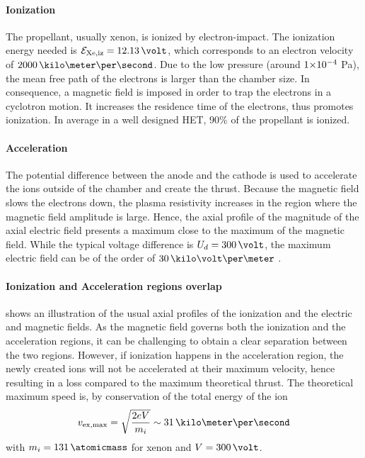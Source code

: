   \paragraph{Ionization\\}
  The propellant, usually xenon, is ionized by electron-impact.
  The ionization energy needed is $\mathcal{E}_{\rm Xe, iz} = 12.13 \,\volt$, which corresponds to an electron velocity of $2000\,\kilo\meter\per\second$.
  Due to the low pressure (around ${{1}{\times}10^{-4}}$ Pa), the mean free path of the electrons is larger than the chamber size.
  In consequence, a magnetic field is imposed in order to trap the electrons in a cyclotron motion.
  It increases the residence time of the electrons, thus promotes  ionization.
  In average in a well designed \ac{HET}, 90\% of the propellant is ionized.

  \paragraph{Acceleration\\}
  The potential difference  between the anode and the cathode is used to accelerate the ions outside of the chamber and create the thrust.
  Because the magnetic field slows the electrons down, the plasma resistivity increases in the region where the magnetic field amplitude is large.
  Hence, the axial profile of the magnitude of the axial electric field presents a maximum close to the maximum of the magnetic field.
  While the typical voltage difference is $U_d=300\,\volt$, the maximum electric field can be of the order of $30\,\kilo\volt\per\meter$ \citep{gawron2008}.

  \paragraph{Ionization and Acceleration regions overlap\\}
   shows an illustration of the usual axial profiles of the ionization and the electric and magnetic fields.
  As the magnetic field governs both the ionization and the acceleration regions, it can be challenging to obtain a clear separation between the two regions.
  However, if ionization happens in the acceleration region, the newly created ions will not be accelerated at their maximum velocity, hence resulting in a loss compared to the maximum theoretical thrust.
  The theoretical maximum speed is, by conservation of the total energy of the ion
  \begin{equation} \label{eq-vmaxtheo}
    v_{\rm ex, max} = \sqrt{ \frac{2 e V}{m_i} } \sim 31 \,\kilo\meter\per\second
  \end{equation}
  with $m_i = 131 \,\atomicmass$ for xenon and $V=300\,\volt$.



